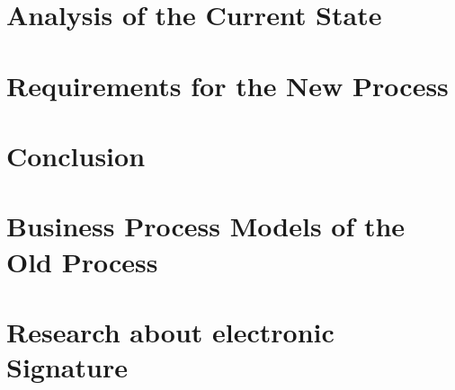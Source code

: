 	\chapter{Analysis of the Current State}
	
	
	\chapter{Requirements for the New Process}
	
	
	\chapter{Conclusion}
	
	
	\printbibliography
	
	\clearpage
	\appendix
	\chapter{Business Process Models of the Old Process}
	\label{bpmnOld}
	
	
	\chapter{Research about electronic Signature}
	\label{res:es}
	
	
%	
	
	
	
